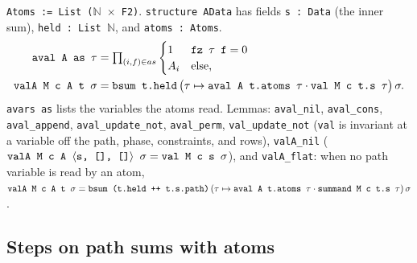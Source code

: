 \begin{definition}\label{def:lean-pathsum-adata}
\textnormal{\texttt{Atoms := List (\allowbreak{}\ensuremath{\mathbb{N}} \ensuremath{\times} F2)}}. \textnormal{\texttt{structure AData}} has fields \textnormal{\texttt{s : Data}} (the inner sum),
\textnormal{\texttt{held : List \ensuremath{\mathbb{N}}}}, and \textnormal{\texttt{atoms : Atoms}}.
\begin{align*}
\textnormal{\texttt{aval A as \ensuremath{\tau}}} &= \textstyle\prod_{(i,f)\in as}\begin{cases}1 & \textnormal{\texttt{fz \ensuremath{\tau} f}} = 0\\ A_i & \text{else,}\end{cases}\\
\textnormal{\texttt{valA M c A t \ensuremath{\sigma}}} &= \textnormal{\texttt{bsum t.\allowbreak{}held}}\,\bigl(\tau\mapsto\textnormal{\texttt{aval A t.\allowbreak{}atoms \ensuremath{\tau}}}\cdot\textnormal{\texttt{val M c t.\allowbreak{}s \ensuremath{\tau}}}\bigr)\,\sigma .
\end{align*}
\textnormal{\texttt{avars as}} lists the variables the atoms read. Lemmas: \textnormal{\texttt{aval\_\allowbreak{}nil}}, \textnormal{\texttt{aval\_\allowbreak{}cons}},
\textnormal{\texttt{aval\_\allowbreak{}append}}, \textnormal{\texttt{aval\_\allowbreak{}update\_\allowbreak{}not}}, \textnormal{\texttt{aval\_\allowbreak{}perm}}, \textnormal{\texttt{val\_\allowbreak{}update\_\allowbreak{}not}} (\textnormal{\texttt{val}}
is invariant at a variable off the path, phase, constraints, and rows), \textnormal{\texttt{valA\_\allowbreak{}nil}}
($\textnormal{\texttt{valA M c A \ensuremath{\langle}s,\allowbreak{} [],\allowbreak{} []\ensuremath{\rangle} \ensuremath{\sigma}}} = \textnormal{\texttt{val M c s \ensuremath{\sigma}}}$), and \textnormal{\texttt{valA\_\allowbreak{}flat}}: when no path
variable is read by an atom,
$\textnormal{\texttt{valA M c A t \ensuremath{\sigma}}} = \textnormal{\texttt{bsum (\allowbreak{}t.\allowbreak{}held ++ t.\allowbreak{}s.\allowbreak{}path)}}\,(\tau\mapsto\textnormal{\texttt{aval A t.\allowbreak{}atoms \ensuremath{\tau}}}\cdot\textnormal{\texttt{summand M c t.\allowbreak{}s \ensuremath{\tau}}})\,\sigma$.
\end{definition}

\subsection{Steps on path sums with atoms}

